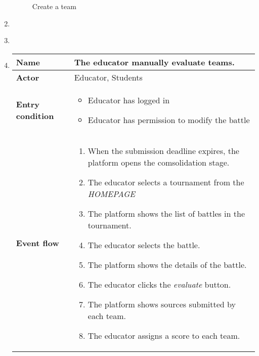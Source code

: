 \begin{enumerate}[label=\textbf{UC\arabic*}:,leftmargin=1.3cm]
          \begin{figure}[H]
              \centering
              \caption{Create a team}
              \label{fig:Create a team}
          \end{figure}
          \pagebreak
    \item
    \item \textbf{}
          \pagebreak
    \item \textbf{}
          \begin{table}[H]
              \centering
              \begin{tabular}{|l|p{11.9cm}|}
                  \hline
                  \textbf{Name}            & The educator manually evaluate teams.                                       \\\hline
                  \textbf{Actor}           & Educator, Students                                                          \\\hline
                  \textbf{Entry condition} &
                  \begin{itemize}
                      \item Educator has logged in
                      \item Educator has permission to modify the battle
                  \end{itemize}                                                      \\\hline
                  \textbf{Event flow}      &
                  \begin{enumerate}[label=\arabic*.]
                      \item When the submission deadline expires, the platform opens the comsolidation stage.
                      \item The educator selects a tournament from the \emph{HOMEPAGE}
                      \item The platform shows the list of battles in the tournament.
                      \item The educator selects the battle.
                      \item The platform shows the details of the battle.
                      \item The educator clicks the \emph{evaluate} button.
                      \item The platform shows sources submitted by each team.
                      \item The educator assigns a score to each team.

\end{enumerate}
\end{tabular}
\end{table}
\end{enumerate}
